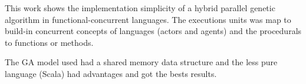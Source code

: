 
This work shows the implementation simplicity of a hybrid parallel genetic algorithm in functional-concurrent languages. The executions units was map to build-in concurrent concepts of languages (actors and agents) and the procedurals to functions or methods.

The GA model used had a shared memory data structure and the less pure language (Scala) had advantages and got the bests results.




